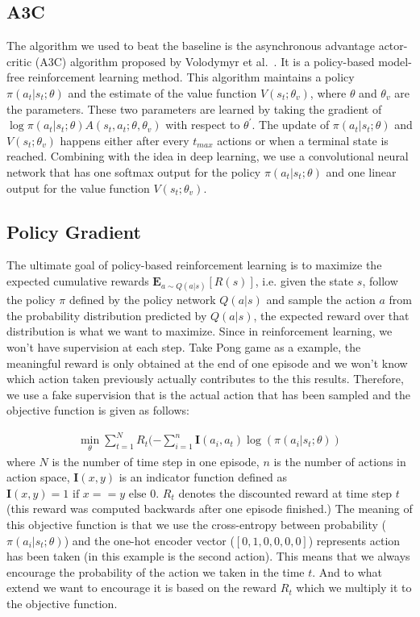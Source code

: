 \subsection{A3C}
The algorithm we used to beat the baseline is the asynchronous advantage actor-critic (A3C) algorithm proposed by Volodymyr et al.~\cite{mnih2016asynchronous}. It is a policy-based model-free reinforcement learning method. This algorithm maintains a policy $\pi (a_{t}|s_{t};\theta)$ and the estimate of the value function $V(s_{t};\theta_{v})$, where $\theta$ and $\theta_{v}$ are the parameters. These two parameters are learned by taking the gradient of $\log \pi (a_{t}|s_{t};\theta) A(s_{t},a_{t};\theta,\theta_{v})$ with respect to $\theta^{\prime}$. The update of $\pi (a_{t}|s_{t};\theta)$ and $V(s_{t};\theta_{v})$ happens either after every $t_{max}$ actions or when a terminal state is reached. Combining with the idea in deep learning, we use a convolutional neural network that has one softmax output for the policy $\pi (a_{t}|s_{t};\theta)$ and one linear output for the value function $V(s_{t};\theta_{v})$.


\subsection{Policy Gradient}
The ultimate goal of policy-based reinforcement learning is to maximize the 
expected cumulative rewards $\textbf{E}_{a \sim Q(a|s)}[R(s)]$, i.e. given 
the state $s$, follow the policy $\pi$ defined by the policy network $Q(a|s)$ and
sample the action $a$ from the probability distribution predicted by $Q(a|s)$, the 
expected reward over that distribution is what we want to maximize. Since in 
reinforcement learning, we won't have supervision at each step. Take Pong game 
as a example, the meaningful reward is only obtained at the end of one episode
and we won't know which action taken previously actually contributes to the 
this results. Therefore, we use a fake supervision that is the actual action 
that has been sampled and the objective function is given as follows:

\begin{equation*}
\begin{split}
\min_{\theta}\sum_{t=1}^N R_t (-\sum_{i=1}^{n}\textbf{I}(a_i, a_t)\log(\pi(a_i|s_t; \theta))
\end{split}
\end{equation*}
where $N$ is the number of time step in one episode, $n$ is the number of actions
in action space, $\textbf{I}(x, y)$ is an indicator function defined as $\textbf{I}(x, y) = 1 \text{ if } x==y \text{ else } 0$.
$R_t$ denotes the discounted reward at time step $t$ (this reward was computed backwards after one episode finished.)
The meaning of this objective function is that we use the cross-entropy between 
probability ($\pi(a_i|s_t; \theta)$) and the one-hot encoder vector ($[0,1,0,0,0,0]$) represents action has been taken
(in this example is the second action). This means that we always encourage the probability of the action 
we taken in the time $t$. And to what extend we want to encourage it is based on the reward $R_t$ which we 
multiply it to the objective function. 


